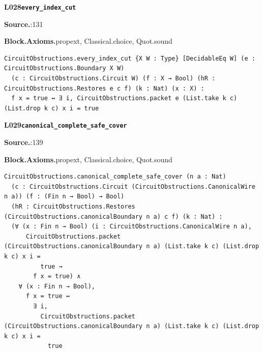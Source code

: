 \par\medskip\noindent\begin{minipage}{\textwidth}
{\small\bfseries L028\enspace\texttt{every\_index\_cut}\par}
{\footnotesize\raggedright\textbf{Source.}\enspace{}:131\par
\textbf{Block.}\quad\textbf{Axioms.}\enspace propext, Classical.choice, Quot.sound\par}\nopagebreak
\begin{lstlisting}
CircuitObstructions.every_index_cut {X W : Type} [DecidableEq W] (e : CircuitObstructions.Boundary X W)
  (c : CircuitObstructions.Circuit W) (f : X → Bool) (hR : CircuitObstructions.Restores e c f) (k : Nat) (x : X) :
  f x = true ↔ ∃ i, CircuitObstructions.packet e (List.take k c) (List.drop k c) x i = true
\end{lstlisting}
\end{minipage}\par

\par\medskip\noindent\begin{minipage}{\textwidth}
{\small\bfseries L029\enspace\texttt{canonical\_complete\_safe\_cover}\par}
{\footnotesize\raggedright\textbf{Source.}\enspace{}:139\par
\textbf{Block.}\quad\textbf{Axioms.}\enspace propext, Classical.choice, Quot.sound\par}\nopagebreak
\begin{lstlisting}
CircuitObstructions.canonical_complete_safe_cover (n a : Nat)
  (c : CircuitObstructions.Circuit (CircuitObstructions.CanonicalWire n a)) (f : (Fin n → Bool) → Bool)
  (hR : CircuitObstructions.Restores (CircuitObstructions.canonicalBoundary n a) c f) (k : Nat) :
  (∀ (x : Fin n → Bool) (i : CircuitObstructions.CanonicalWire n a),
      CircuitObstructions.packet (CircuitObstructions.canonicalBoundary n a) (List.take k c) (List.drop k c) x i =
          true →
        f x = true) ∧
    ∀ (x : Fin n → Bool),
      f x = true ↔
        ∃ i,
          CircuitObstructions.packet (CircuitObstructions.canonicalBoundary n a) (List.take k c) (List.drop k c) x i =
            true
\end{lstlisting}
\end{minipage}\par

